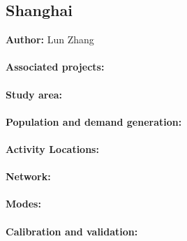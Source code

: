 \subsection{Shanghai}
\label{ch:scenarios:shanghai}
\hfill \textbf{Author:} Lun Zhang

\citep[][]{WangtEtAl_TRB_2013}

\paragraph{Associated projects:}

\paragraph{Study area:}

\paragraph{Population and demand generation:}

\paragraph{Activity Locations:}

\paragraph{Network:}

\paragraph{Modes:}

\paragraph{Calibration and validation:}


